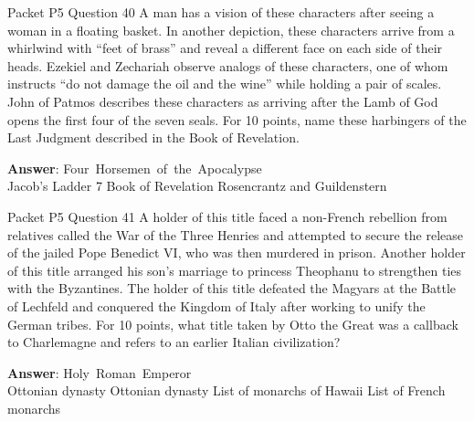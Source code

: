\begin{frame}{Packet P5 Question 40}
A man has a vision of   these characters after seeing a woman in a floating basket. In another depiction, these characters arrive from a whirlwind with ``feet of brass'' and reveal a different face on each side of their heads. Ezekiel and Zechariah observe analogs of these characters, one of whom instructs “do not damage the oil and the wine” while holding a pair of scales. John of Patmos describes these characters as arriving after the Lamb of God opens the first four of the seven seals. For 10 points, name these harbingers of the Last Judgment described in the Book of Revelation.      

\textbf{Answer}: Four\ Horsemen\ of\ the\ Apocalypse\\
 Jacob's Ladder
 7
 Book of Revelation
 Rosencrantz and Guildenstern
\end{frame}

\begin{frame}{Packet P5 Question 41}
A holder of this title faced a non-French rebellion from relatives called the War of the Three Henries and attempted to secure the release of the jailed Pope Benedict VI, who was then murdered in prison. Another holder of this title arranged his son’s marriage to princess Theophanu to strengthen ties with the Byzantines. The holder of this title defeated the Magyars at the Battle of Lechfeld and conquered     the Kingdom of   Italy after working to unify the German tribes. For 10 points, what title taken by Otto the Great was a callback to Charlemagne and refers to an earlier Italian civilization?  

\textbf{Answer}: Holy\ Roman\ Emperor\\
 Ottonian dynasty
 Ottonian dynasty
 List of monarchs of Hawaii
 List of French monarchs
\end{frame}

